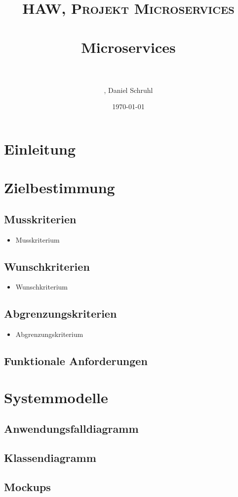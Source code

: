\documentclass[paper=a4, fontsize=11pt]{scrreprt}
\title{	
	\normalfont \normalsize 
	\textsc{HAW, Projekt Microservices} \\ [25pt]
	\horrule{0.5pt} \\[0.4cm]
	\huge Microservices \\
	\horrule{2pt} \\[0.5cm]
}
\author{, Daniel Schruhl}
\date{\normalsize\today}
\numberwithin{equation}{section}
\numberwithin{figure}{section}
\numberwithin{table}{section}
\newcounter{mk}
\newcounter{fa}
\newcounter{wk}
\newcounter{ak}
\begin{document}
\maketitle

\tableofcontents

\chapter{Einleitung}

\chapter{Zielbestimmung}

\section{Musskriterien}

\begin{itemize}
    \item[\newmk] Musskriterium
\end{itemize}

\section{Wunschkriterien}
\begin{itemize}
    \item[\newwk] Wunschkriterium
\end{itemize}

\section{Abgrenzungskriterien}
\begin{itemize}
    \item[\newak] Abgrenzungskriterium
\end{itemize}

\section{Funktionale Anforderungen}

\chapter{Systemmodelle}

\section{Anwendungsfalldiagramm}

\section{Klassendiagramm}

\section{Mockups}
\end{document}

